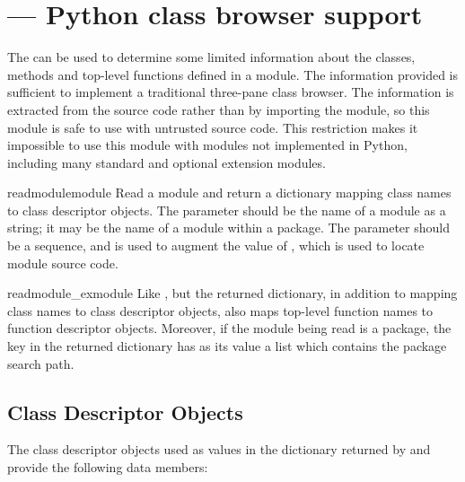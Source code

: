 \section{ ---
         Python class browser support}



The  can be used to determine some limited information
about the classes, methods and top-level functions
defined in a module.  The information
provided is sufficient to implement a traditional three-pane class
browser.  The information is extracted from the source code rather
than by importing the module, so this module is safe to use with
untrusted source code.  This restriction makes it impossible to use
this module with modules not implemented in Python, including many
standard and optional extension modules.


\begin{funcdesc}{readmodule}{module}
  Read a module and return a dictionary mapping class names to class
  descriptor objects.  The parameter  should be the name
  of a module as a string; it may be the name of a module within a
  package.  The  parameter should be a sequence, and is used
  to augment the value of , which is used to locate
  module source code.
\end{funcdesc}

\begin{funcdesc}{readmodule_ex}{module}
  Like , but the returned dictionary, in addition
  to mapping class names to class descriptor objects, also maps
  top-level function names to function descriptor objects.  Moreover, if
  the module being read is a package, the key  in the
  returned dictionary has as its value a list which contains the package
  search path.
\end{funcdesc}


\subsection{Class Descriptor Objects \label{pyclbr-class-objects}}

The class descriptor objects used as values in the dictionary returned
by  and 
provide the following data members:


